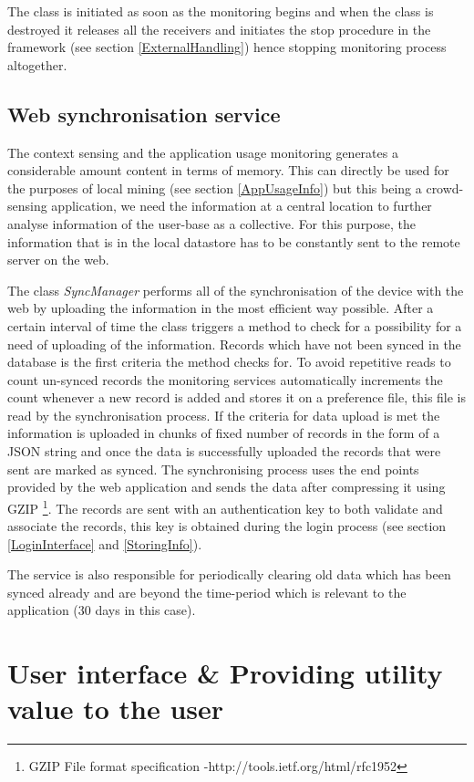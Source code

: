 \documentclass[12pt]{report}
\begin{document}
The class is initiated as soon as the monitoring begins and when the class is destroyed it releases all the receivers and initiates the stop procedure in the framework (see section \ref{ExternalHandling}) hence stopping monitoring process altogether.

\subsection{Web synchronisation service}
The context sensing and the application usage monitoring generates a considerable amount content in terms of memory. This can directly be used for the purposes of local mining (see section \ref{AppUsageInfo}) but this being a crowd-sensing application, we need the information at a central location to further analyse information of the user-base as a collective. For this purpose, the information that is in the local datastore has to be constantly sent to the remote server on the web.

The class \textit{SyncManager} performs all of the synchronisation of the device with the web by uploading the information in the most efficient way possible. After a certain interval of time the class triggers a method to check for a possibility for a need of uploading of the information. Records which have not been synced in the database is the first criteria the method checks for. To avoid repetitive reads to count un-synced records the monitoring services automatically increments the count whenever a new record is added and stores it on a preference file, this file is read by the synchronisation process. If the criteria for data upload is met the information is uploaded in chunks of fixed number of records in the form of a JSON string and once the data is successfully uploaded the records that were sent are marked as synced. The synchronising process uses the end points provided by the web application and sends the data after compressing it using GZIP \footnote{GZIP File format specification -http://tools.ietf.org/html/rfc1952}. The records are sent with an authentication key to both validate and associate the records, this key is obtained during the login process (see section \ref{LoginInterface} and \ref{StoringInfo}).

The service is also responsible for periodically clearing old data which has been synced already and are beyond the time-period which is relevant to the application (30 days in this case).

\section{User interface \& Providing utility value to the user}
\end{document}
